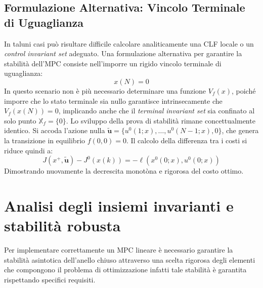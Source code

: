 \subsection{Formulazione Alternativa: Vincolo Terminale di Uguaglianza}
In taluni casi può risultare difficile calcolare analiticamente una CLF locale o un \textit{control invariant set} adeguato. Una formulazione alternativa per garantire la stabilità dell'MPC consiste nell'imporre un rigido vincolo terminale di uguaglianza:
\begin{equation}
	x(N) = 0
\end{equation}
In questo scenario non è più necessario determinare una funzione $V_f(x)$, poiché imporre che lo stato terminale sia nullo garantisce intrinsecamente che $V_f(x(N)) = 0$, implicando anche che il \textit{terminal invariant set} sia confinato al solo punto $\mathbb{X}_f = \{0\}$.
Lo sviluppo della prova di stabilità rimane concettualmente identico. Si accoda l'azione nulla $\tilde{\mathbf{u}} = \{u^0(1;x), \dots, u^0(N-1;x), 0\}$, che genera la transizione in equilibrio $f(0,0) = 0$. Il calcolo della differenza tra i costi si riduce quindi a:
\begin{equation}
	J(x^+, \tilde{\mathbf{u}}) - J^0(x(k)) = -\ell(x^0(0;x), u^0(0;x))
\end{equation}
Dimostrando nuovamente la decrescita monotòna e rigorosa del costo ottimo.

\section{Analisi degli insiemi invarianti e stabilità robusta}

Per implementare correttamente un MPC lineare è necessario garantire la stabilità asintotica dell'anello chiuso attraverso una scelta rigorosa degli elementi che compongono il problema di ottimizzazione infatti tale stabilità è garantita rispettando specifici requisiti.


